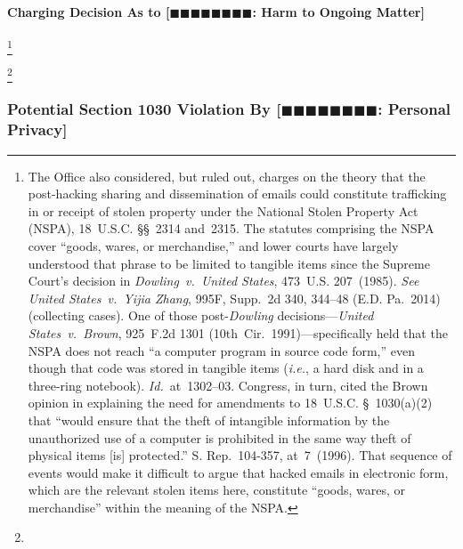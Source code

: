 \paragraph{Charging Decision As to [$\blacksquare\blacksquare\blacksquare\blacksquare\blacksquare\blacksquare\blacksquare\blacksquare$: Harm to Ongoing Matter]}
\footnote{The Office also considered, but ruled out, charges on the theory that the post-hacking sharing and dissemination of emails could constitute trafficking in or receipt of stolen property under the National Stolen Property Act (NSPA), 18~U.S.C. \S\S~2314 and~2315.
The statutes comprising the NSPA cover ``goods, wares, or merchandise,'' and lower courts have largely understood that phrase to be limited to tangible items since the Supreme Court's decision in \textit{Dowling~v.\ United States}, 473~U.S. 207~(1985).
\textit{See United States~v.\ Yijia Zhang}, 995F, Supp.~2d 340, 344--48 (E.D. Pa.~2014) (collecting cases).
One of those post-\textit{Dowling} decisions---\textit{United States~v.\ Brown}, 925~F.2d 1301 (10th~Cir.~1991)---specifically held that the NSPA does not reach ``a computer program in source code form,'' even though that code was stored in tangible items (\textit{i.e.}, a hard disk and in a three-ring notebook).
\textit{Id.}~at~1302--03.
Congress, in turn, cited the Brown opinion in explaining the need for amendments to 18~U.S.C. \S~1030(a)(2) that ``would ensure that the theft of intangible information by the unauthorized use of a computer is prohibited in the same way theft of physical items [is] protected.''
S. Rep.~104-357, at~7~(1996).
That sequence of events would make it difficult to argue that hacked emails in electronic form, which are the relevant stolen items here, constitute ``goods, wares, or merchandise'' within the meaning of the NSPA.}




\footnote{}






\subsubsection{Potential Section 1030 Violation By [$\blacksquare\blacksquare\blacksquare\blacksquare\blacksquare\blacksquare\blacksquare\blacksquare$: Personal Privacy]}


